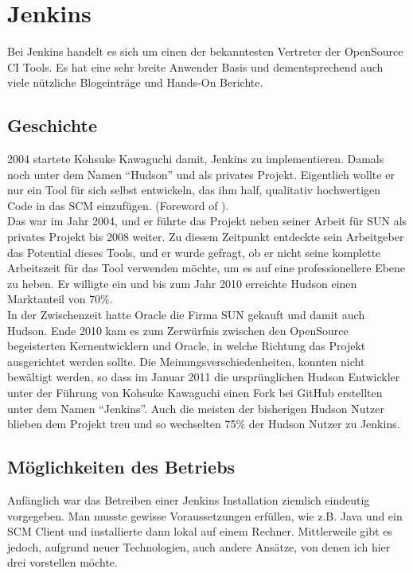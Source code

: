 \pagebreak

\chapter{Jenkins}
Bei Jenkins handelt es sich um einen der bekanntesten Vertreter der OpenSource CI Tools. Es hat eine sehr breite Anwender Basis und dementsprechend auch viele nützliche Blogeinträge und Hands-On Berichte.
\section{Geschichte}
2004 startete Kohsuke Kawaguchi damit, Jenkins zu implementieren. Damals noch unter dem Namen "`Hudson"' und als privates Projekt. Eigentlich wollte er nur ein Tool für sich selbst entwickeln, das ihm half, qualitativ hochwertigen Code in das SCM einzufügen. (Foreword of \cite{smart2011jenkins}).\\
Das war im Jahr 2004, und er führte das Projekt neben seiner Arbeit für SUN als privates Projekt bis 2008 weiter. Zu diesem Zeitpunkt entdeckte sein Arbeitgeber das Potential dieses Tools, und er wurde gefragt, ob er nicht seine komplette Arbeitszeit für das Tool verwenden möchte, um es auf eine professionellere Ebene zu heben. Er willigte ein und bis zum Jahr 2010 erreichte Hudson einen Marktanteil von 70\%.\cite[3]{smart2011jenkins}\\
In der Zwischenzeit hatte Oracle die Firma SUN gekauft und damit auch Hudson. Ende 2010 kam es zum Zerwürfnis zwischen den OpenSource begeisterten Kernentwicklern und Oracle, in welche Richtung das Projekt ausgerichtet werden sollte. Die Meinungsverschiedenheiten, konnten nicht bewältigt werden, so dass im Januar 2011 die ursprünglichen Hudson Entwickler unter der Führung von Kohsuke Kawaguchi einen Fork bei GitHub erstellten unter dem Namen "`Jenkins"'. Auch die meisten der bisherigen Hudson Nutzer blieben dem Projekt treu und so wechselten 75\% der Hudson Nutzer zu Jenkins. \cite[3-4]{smart2011jenkins}
\section{Möglichkeiten des Betriebs}
Anfänglich war das Betreiben einer Jenkins Installation ziemlich eindeutig vorgegeben. Man musste gewisse Voraussetzungen erfüllen, wie z.B. Java und ein SCM Client und installierte dann lokal auf einem Rechner. Mittlerweile gibt es jedoch, aufgrund neuer Technologien, auch andere Ansätze, von denen ich hier drei vorstellen möchte.
